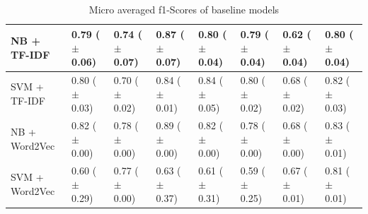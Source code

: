 \documentclass[a4paper,twoside,phd]{BYUPhys}
\begin{document}
\begin{table}[H]
\begin{tabular}{|p{1.7cm}|p{1.6cm}|p{1.6cm}|p{1.6cm}|p{1.6cm}|p{1.6cm}|p{1.6cm}|p{1.6cm}|}
		NB + TF-IDF  & 0.79 \newline ($\pm$ 0.06) & 0.74 \newline ($\pm$ 0.07) & 0.87 \newline ($\pm$ 0.07) & 0.80 \newline ($\pm$ 0.04) & 0.79 \newline ($\pm$ 0.04)  & 0.62 \newline ($\pm$ 0.04)  & 0.80 \newline ($\pm$ 0.04)  \\
		\hline
		
		SVM + TF-IDF  & 0.80 \newline ($\pm$ 0.03) & 0.70 \newline ($\pm$ 0.02) & 0.84 \newline ($\pm$ 0.01) & 0.84 \newline ($\pm$ 0.05) & 0.80 \newline ($\pm$ 0.02)  & 0.68 \newline ($\pm$ 0.02)  & 0.82 \newline ($\pm$ 0.03)                                                                                                                                             \\
		\hline                                                                                                                                              
		
		NB + Word2Vec  & 0.82 \newline ($\pm$ 0.00) & 0.78 \newline ($\pm$ 0.00) & 0.89 \newline ($\pm$ 0.00) & 0.82 \newline ($\pm$ 0.00) & 0.78 \newline ($\pm$ 0.00)  & 0.68 \newline ($\pm$ 0.00)   & 0.83 \newline ($\pm$ 0.01)  \\
		\hline
		
		SVM + Word2Vec  & 0.60 \newline ($\pm$ 0.29) & 0.77 \newline ($\pm$ 0.00) & 0.63 \newline ($\pm$ 0.37) & 0.61 \newline ($\pm$ 0.31) & 0.59 \newline ($\pm$ 0.25)  & 0.67 \newline ($\pm$ 0.01) & 0.81 \newline ($\pm$ 0.01)                                                                                                                                              \\
		\hline                                                                
		                                                                                                                                                                  
	\end{tabular}
	\caption{Micro averaged f1-Scores of baseline models}
	\label{table:BaselineAccuracy}
\end{table}
\end{document}
